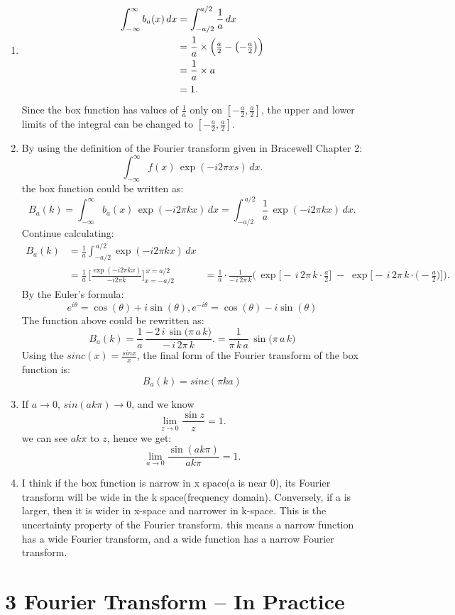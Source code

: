 \documentclass[12pt]{article}
\begin{document}
\subsection{}
\begin{enumerate}[label=(\roman*)]
  \item \[
\begin{aligned}
\int_{-\infty}^{\infty} b_a(x)\,dx 
&= \int_{-a/2}^{a/2} \frac{1}{a}\,dx  \\
&= \frac{1}{a} \times \Bigl(\tfrac{a}{2} - \bigl(-\tfrac{a}{2}\bigr)\Bigr) \\
&= \frac{1}{a} \times a \\
&= 1.
\end{aligned}
\]
Since the box function has values of \(\frac{1}{a}\) only on \([-\frac{a}{2},\frac{a}{2}]\), the upper and lower limits of the integral can be changed to \([-\frac{a}{2},\frac{a}{2}]\).
  \item
  By using the definition of the Fourier transform given in Bracewell Chapter 2:
  \[
    \int_{-\infty}^{\infty} f(x)\,\exp(-i2 \pi xs)\,dx.
    \]
  the box function could be written as:
    \[
B_a(k) 
= \int_{-\infty}^{\infty} b_a(x)\,\exp(-i2\pi kx)\,dx 
= \int_{-a/2}^{\,a/2} \frac{1}{a}\,\exp(-i2\pi kx)\,dx.
\]
Continue calculating:
\[
\begin{aligned}
B_a(k)
&= \frac{1}{a} \int_{-a/2}^{\,a/2} \exp(-i2\pi k x)\,dx \\[6pt]
&= \frac{1}{a} \,\biggl[\frac{\exp(-i2\pi kx)}{-i2\pi k}\biggr]_{x=-a/2}^{\,x=a/2}
&= \frac{1}{a} \cdot \frac{1}{-\,i\,2\pi\,k}
\bigl(\,\exp\bigl[-\,i\,2\pi\,k \cdot \tfrac{a}{2}\bigr]
 \;-\; \exp\bigl[-\,i\,2\pi\,k \cdot \bigl(-\tfrac{a}{2}\bigr)\bigr]\bigr).
\end{aligned}
\]
By the Euler's formula:
\[
e^{i\theta} = \cos(\theta) + i \sin(\theta), e^{-i\theta} = \cos(\theta) - i \sin(\theta)
\]
The function above could be rewritten as:
\[
B_a(k) 
= \frac{1}{a} \,\frac{-\,2\,i\,\sin\bigl(\pi\,a\,k\bigr)}{-\,i\,2\pi\,k}. = \frac{1}{\pi\,k\,a}\,\sin\bigl(\pi\,a\,k\bigr)
\]
Using the \(sinc(x) = \frac{sinx}{x}\), the final form of the Fourier transform of the box function is:
\[B_a(k) = sinc(\pi k a)\]

  \item 
  If \(a \rightarrow 0\), \(sin(ak\pi)\rightarrow 0\), and we know 
  \[
\lim_{z \to 0} \frac{\sin z}{z} = 1.
\]
 we can see \(ak\pi\) to \(z\), hence we get:
  \[
\lim_{a \to 0} \frac{\sin (ak\pi)}{ak\pi} = 1.
\]
  \item 
  I think if the box function is narrow in x space(a is near 0),  its Fourier transform will be wide in the k space(frequency domain). Conversely, if a is larger, then it is wider in x-space and narrower in k-space. This is the uncertainty property of the Fourier transform. this means a narrow function has a wide Fourier transform, and a wide function has a narrow Fourier transform.
\end{enumerate}
\section{3 Fourier Transform – In Practice}
\end{document}
